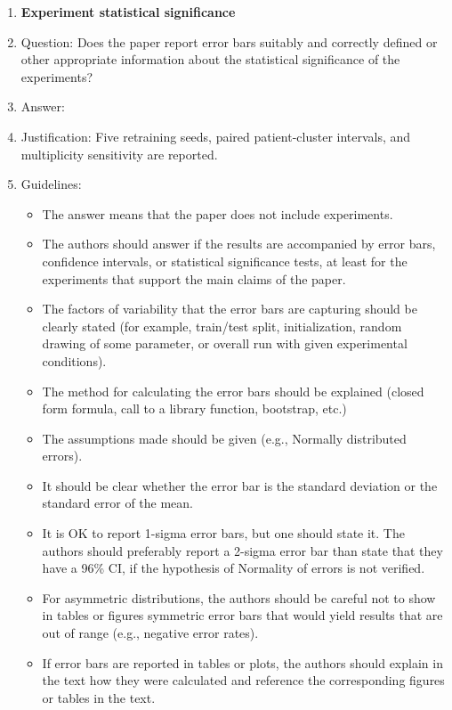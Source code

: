 \documentclass{article}
\begin{document}
\begin{enumerate}
\item {\bf Experiment statistical significance}
    \item[] Question: Does the paper report error bars suitably and correctly defined or other appropriate information about the statistical significance of the experiments?
    \item[] Answer: \answerYes{}
    \item[] Justification: Five retraining seeds, paired patient-cluster intervals, and multiplicity sensitivity are reported.
    \item[] Guidelines:
    \begin{itemize}
        \item The answer \answerNA{} means that the paper does not include experiments.
        \item The authors should answer \answerYes{} if the results are accompanied by error bars, confidence intervals, or statistical significance tests, at least for the experiments that support the main claims of the paper.
        \item The factors of variability that the error bars are capturing should be clearly stated (for example, train/test split, initialization, random drawing of some parameter, or overall run with given experimental conditions).
        \item The method for calculating the error bars should be explained (closed form formula, call to a library function, bootstrap, etc.)
        \item The assumptions made should be given (e.g., Normally distributed errors).
        \item It should be clear whether the error bar is the standard deviation or the standard error of the mean.
        \item It is OK to report 1-sigma error bars, but one should state it. The authors should preferably report a 2-sigma error bar than state that they have a 96\% CI, if the hypothesis of Normality of errors is not verified.
        \item For asymmetric distributions, the authors should be careful not to show in tables or figures symmetric error bars that would yield results that are out of range (e.g., negative error rates).
        \item If error bars are reported in tables or plots, the authors should explain in the text how they were calculated and reference the corresponding figures or tables in the text.
    \end{itemize}


\end{enumerate}
\end{document}
